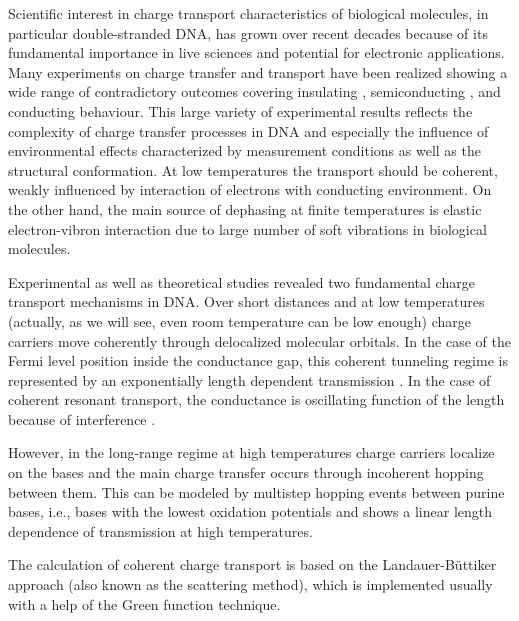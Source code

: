 \documentclass[reprint,superscriptaddress,nofootinbib,amsmath,amssymb,prb,floatfix]{revtex4-1}
\begin{document}
Scientific interest in charge transport characteristics of biological molecules, in particular
double-stranded DNA, has grown over recent decades because of its fundamental importance in live
sciences and potential for electronic applications. \cite{endres_colloquium_2004, Cuniberti2006}
Many experiments on charge transfer and transport have been realized showing a wide range of
contradictory outcomes covering insulating \cite{braun_dna-templated_1998, de_pablo_absence_2000,
  storm_insulating_2001, zhang_insulating_2002}, semiconducting \cite{porath_direct_2000}, and
conducting \cite{fink_electrical_1999, cai_self-assembled_2000, tran_charge_2000,
  rakitin_metallic_2001, yoo_electrical_2001, kasumov_proximity-induced_2001} behaviour. This large variety of
experimental results reflects the complexity of charge transfer processes in DNA and especially the
influence of environmental effects characterized by measurement conditions as well as the structural
conformation. At low temperatures the transport should be coherent, weakly influenced by interaction
of electrons with conducting environment. On the other hand, the main source of dephasing at finite
temperatures is elastic electron-vibron interaction due to large number of soft vibrations in
biological molecules.

Experimental as well as theoretical studies revealed two fundamental charge transport mechanisms in
DNA. Over short distances and at low temperatures (actually, as we will see, even room temperature
can be low enough) charge carriers move coherently through delocalized molecular orbitals. In the
case of the Fermi level position inside the conductance gap, this coherent tunneling regime is
represented by an exponentially length dependent transmission \cite{giese_direct_2001,
  jortner_charge_1998, tong_tunneling_2002, olofsson_electron_2001}. In the case of coherent
resonant transport, the conductance is oscillating function of the length because of interference
\cite{natallia_v._distance-dependent_2010}.

However, in the long-range regime at high temperatures charge carriers localize on the bases and
the main charge transfer occurs through incoherent hopping between them.  This can be modeled by
multistep hopping events between purine bases, i.e., bases with the lowest oxidation potentials and
shows a linear length dependence of transmission at high temperatures.\cite{jortner_charge_1998,
  meggers_sequence_1998, bixon_energetic_2000, kubar_efficient_2008}

The calculation of coherent charge transport is based on the Landauer-B\"uttiker approach (also
known as the scattering method), which is implemented usually with a help of the Green function
technique\cite{Datta95book,DiVentra08book,Ryndyk09inbook,Ryndyk2015}.
\end{document}
